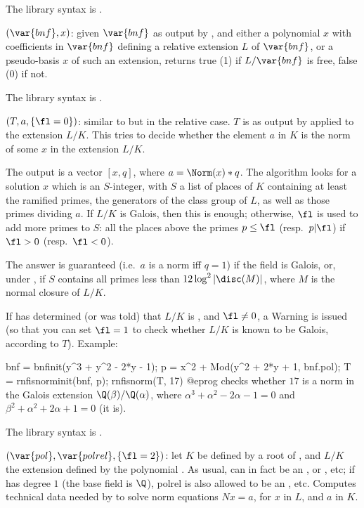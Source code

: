 The library syntax is .

$(\var{bnf},x)$: \label{se:rnfisfree}given $\var{bnf}$ as output by
, and either a polynomial $x$ with coefficients in $\var{bnf}$
defining a relative extension $L$ of $\var{bnf}$, or a pseudo-basis $x$ of
such an extension, returns true (1) if $L/\var{bnf}$ is free, false (0) if
not.

The library syntax is .

$(T,a,\{\fl=0\})$: \label{se:rnfisnorm}similar to
 but in the relative case. $T$ is as output by
 applied to the extension $L/K$. This tries to decide
whether the element $a$ in $K$ is the norm of some $x$ in the extension
$L/K$.

The output is a vector $[x,q]$, where $a = \Norm(x)*q$. The
algorithm looks for a solution $x$ which is an $S$-integer, with $S$ a list
of places of $K$ containing at least the ramified primes, the generators of
the class group of $L$, as well as those primes dividing $a$. If $L/K$ is
Galois, then this is enough; otherwise, $\fl$ is used to add more primes to
$S$: all the places above the primes $p \leq \fl$ (resp.~$p|\fl$) if $\fl>0$
(resp.~$\fl<0$).

The answer is guaranteed (i.e.~$a$ is a norm iff $q = 1$) if the field is
Galois, or, under , if $S$ contains all primes less than
$12\log^2\left|\disc(M)\right|$, where $M$ is the normal
closure of $L/K$.

If  has determined (or was told) that $L/K$ is
, and $\fl \neq 0$, a Warning is issued (so that you can set
$\fl = 1$ to check whether $L/K$ is known to be Galois, according to $T$).
Example:

\bprog
bnf = bnfinit(y^3 + y^2 - 2*y - 1);
p = x^2 + Mod(y^2 + 2*y + 1, bnf.pol);
T = rnfisnorminit(bnf, p);
rnfisnorm(T, 17)
@eprog\noindent
checks whether $17$ is a norm in the Galois extension $\Q(\beta) /
\Q(\alpha)$, where $\alpha^3 + \alpha^2 - 2\alpha - 1 = 0$ and $\beta^2 +
\alpha^2 + 2\alpha + 1 = 0$ (it is).

The library syntax is .

$(\var{pol},\var{polrel},\{\fl=2\})$: \label{se:rnfisnorminit}let $K$ be defined by a root of , and $L/K$ the extension defined
by the polynomial . As usual,  can in fact be an ,
or , etc; if  has degree $1$ (the base field is $\Q$),
polrel is also allowed to be an , etc. Computes technical data needed
by  to solve norm equations $Nx = a$, for $x$ in $L$, and $a$
in $K$.

